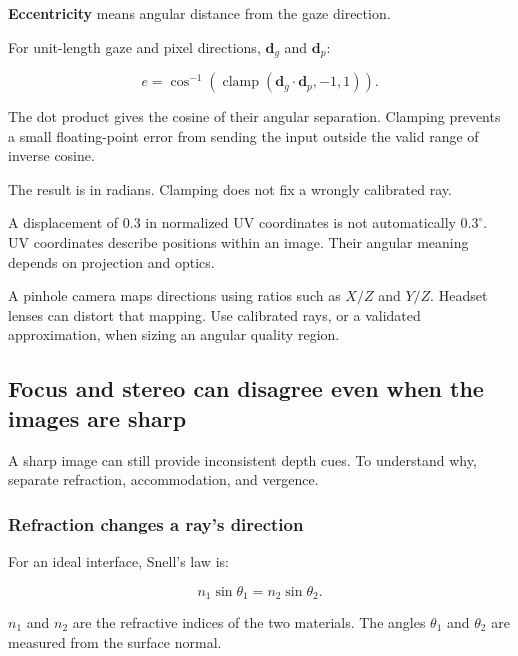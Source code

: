 \hypertarget{04-visual-computing-ii-ch043-measuring-distance-from-gaze}{}

\textbf{Eccentricity} means angular distance from the gaze direction.

For unit-length gaze and pixel directions, \(\mathbf d_g\) and \(\mathbf d_p\):

\[
e=\cos^{-1}\left(
\operatorname{clamp}(\mathbf d_g\cdot\mathbf d_p,-1,1)
\right).
\]

The dot product gives the cosine of their angular separation. Clamping prevents a small floating-point error from sending the input outside the valid range of inverse cosine.

The result is in radians. Clamping does not fix a wrongly calibrated ray.

A displacement of 0.3 in normalized UV coordinates is not automatically \(0.3^\circ\). UV coordinates describe positions within an image. Their angular meaning depends on projection and optics.

A pinhole camera maps directions using ratios such as \(X/Z\) and \(Y/Z\). Headset lenses can distort that mapping. Use calibrated rays, or a validated approximation, when sizing an angular quality region.

\subsection{Focus and stereo can disagree even when the images are sharp}\label{04-visual-computing-ii-ch043-focus-and-stereo-can-disagree-even-when-the-images-are-sharp}

\hypertarget{04-visual-computing-ii-ch043-focus-and-stereo-can-disagree-even-when-the-images-are-sharp}{}

A sharp image can still provide inconsistent depth cues. To understand why, separate refraction, accommodation, and vergence.

\subsubsection{Refraction changes a ray's direction}\label{04-visual-computing-ii-ch043-refraction-changes-a-rays-direction}

\hypertarget{04-visual-computing-ii-ch043-refraction-changes-a-rays-direction}{}

For an ideal interface, Snell's law is:

\[
n_1\sin\theta_1=n_2\sin\theta_2.
\]

\(n_1\) and \(n_2\) are the refractive indices of the two materials. The angles \(\theta_1\) and \(\theta_2\) are measured from the surface normal.

